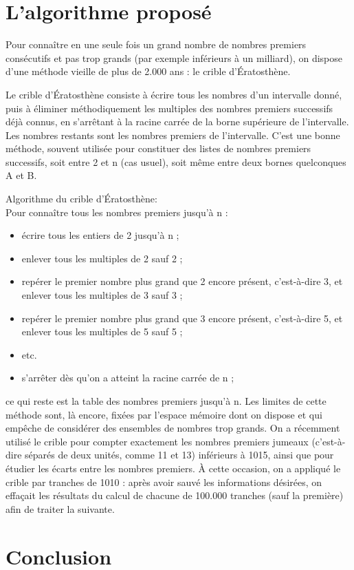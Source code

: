 \documentclass[12pt]{report}
\begin{document}
	\section*{L’algorithme proposé}
	\par{}
	Pour connaître en une seule fois un grand nombre de nombres premiers consécutifs et pas trop grands (par exemple inférieurs à un milliard), on dispose d'une 	méthode vieille de plus de 2.000 ans : le crible d'Ératosthène.
	\newline
	\par{}
	Le crible d'Ératosthène consiste à écrire tous les nombres d'un intervalle donné, puis à éliminer méthodiquement les multiples des nombres premiers successifs déjà connus, en s'arrêtant à la racine carrée de la borne supérieure de l'intervalle. Les nombres restants sont les nombres premiers de l'intervalle. C'est une bonne méthode, souvent utilisée pour constituer des listes de nombres premiers successifs, soit entre 2 et n (cas usuel), soit même entre deux bornes quelconques A et B.
	\newline
	\par{}
	Algorithme du crible d’Ératosthène:\\
	Pour connaître tous les nombres premiers jusqu'à n :
	\begin{itemize}
	\item écrire tous les entiers de 2 jusqu'à n ;
	\item enlever tous les multiples de 2 sauf 2 ;
	\item repérer le premier nombre plus grand que 2 encore présent, c'est-à-dire 3, et enlever tous les multiples de 3 sauf 3 ;
	\item repérer le premier nombre plus grand que 3 encore présent, c'est-à-dire 5, et enlever tous les multiples de 5 sauf 5 ;
	\item etc.
	\item s'arrêter dès qu'on a atteint la racine carrée de n ;
	\end{itemize}
\par{}
	ce qui reste est la table des nombres premiers jusqu'à n.
	Les limites de cette méthode sont, là encore, fixées par l'espace mémoire dont on dispose et qui empêche de considérer des ensembles de nombres trop grands. On a récemment utilisé le crible pour compter exactement les nombres premiers jumeaux (c'est-à-dire séparés de deux unités, comme 11 et 13) inférieurs à 1015, ainsi que pour étudier les écarts entre les nombres premiers. À cette occasion, on a appliqué le crible par tranches de 1010 : après avoir sauvé les informations désirées, on effaçait les résultats du calcul de chacune de 100.000 tranches (sauf la première) afin de traiter la suivante.
	

\newpage
\section*{ Conclusion}

	
	
\end{document}
